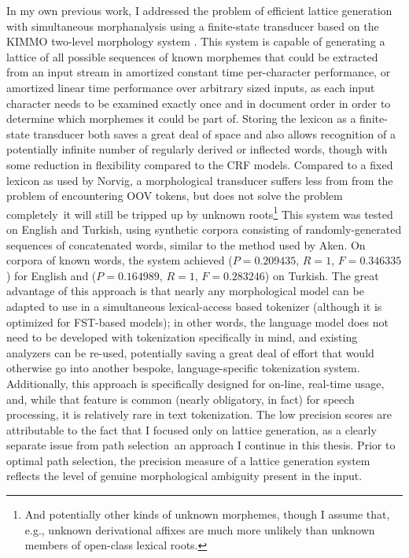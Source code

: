 
In my own previous work\cite{kearsley13}, I addressed the problem of efficient lattice generation with simultaneous morphanalysis using a finite-state transducer based on the KIMMO two-level morphology system \cite{koskenniemi84}. This system is capable of generating a lattice of all possible sequences of known morphemes that could be extracted from an input stream in amortized constant time per-character performance, or amortized linear time performance over arbitrary sized inputs, as each input character needs to be examined exactly once and in document order in order to determine which morphemes it could be part of\cite{kearsley13}. Storing the lexicon as a finite-state transducer both saves a great deal of space and also allows recognition of a potentially infinite number of regularly derived or inflected words, though with some reduction in flexibility compared to the CRF models. Compared to a fixed lexicon as used by Norvig\cite{norvig14}, a morphological transducer suffers less from from the problem of encountering OOV tokens, but does not solve the problem completely\textemdash~it will still be tripped up by unknown roots\footnote{And potentially other kinds of unknown morphemes, though I assume that, e.g., unknown derivational affixes are much more unlikely than unknown members of open-class lexical roots.} This system was tested on English and Turkish, using synthetic corpora consisting of randomly-generated sequences of concatenated words, similar to the method used by Aken\cite{aken11}. On corpora of known words, the system achieved ($P = 0.209435$, $R = 1$, $F = 0.346335$) for English and ($P = 0.164989$, $R = 1$, $F = 0.283246$) on Turkish.
The great advantage of this approach is that nearly any morphological model can be adapted to use in a simultaneous lexical-access based tokenizer (although it is optimized for FST-based models); in other words, the language model does not need to be developed with tokenization specifically in mind, and existing analyzers can be re-used, potentially saving a great deal of effort that would otherwise go into another bespoke, language-specific tokenization system. Additionally, this approach is specifically designed for on-line, real-time usage, and, while that feature is common (nearly obligatory, in fact) for speech processing, it is relatively rare in text tokenization\cite{aken11}. The low precision scores are attributable to the fact that I focused only on lattice generation, as a clearly separate issue from path selection\textemdash~an approach I continue in this thesis. Prior to optimal path selection, the precision measure of a lattice generation system reflects the level of genuine morphological ambiguity present in the input.

